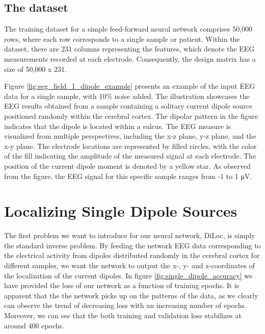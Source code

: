 \documentclass[a4paper, UKenglish, 11pt]{uiomaster}
\begin{document}
\subsection{The dataset}
The training dataset for a simple feed-forward neural network comprises 50,000 rows, where each row corresponds to a single sample or patient. Within the dataset, there are 231 columns representing the features, which denote the EEG measurements recorded at each electrode. Consequently, the design matrix has a size of 50,000 x 231.

Figure \ref{fig:eeg_field_1_dipole_example} presents an example of the input EEG data for a single sample, with 10$\%$ noise added. The illustration showcases the EEG results obtained from a sample containing a solitary current dipole source positioned randomly within the cerebral cortex. The dipolar pattern in the figure indicates that the dipole is located within a sulcus. The EEG measure is visualized from multiple perspectives, including the x-z plane, y-z plane, and the x-y plane. The electrode locations are represented by filled circles, with the color of the fill indicating the amplitude of the measured signal at each electrode. The position of the current dipole moment is denoted by a yellow star. As observed from the figure, the EEG signal for this specific sample ranges from -1 to 1 μV.


\section{Localizing Single Dipole Sources}



The first problem we want to introduce for our neural network, DiLoc, is simply the standard inverse problem. By feeding the network EEG data corresponding to the electrical activity from dipoles distributed randomly in the cerebral cortex for different samples, we want the network to output the x-, y- and z-coordinates of the localization of the current dipoles. In figure \ref{fig:single_dipole_accuracy} we have provided the loss of our network as a function of training epochs. It is apparent that the the network picks up on the patterns of the data, as we clearly can observe the trend of decreasing loss with an increasing number of epochs. Moreover, we can see that the both training and validation loss stabilizes at around 400 epochs.
\end{document}
